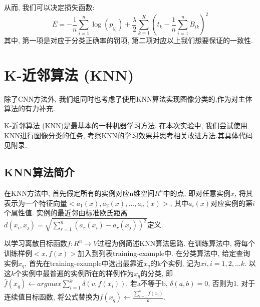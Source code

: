 \documentclass[lang=cn, 11pt,   a4paper]{elegantpaper}
\begin{document}
从而, 我们可以决定损失函数: 
\begin{equation}
E=-\frac{1}{n} \sum_{i=1}^{n} \log \left (p_{y_{i}}\right)+\frac{\lambda}{2} \sum_{k=1}^{K}\left (t_{k}-\frac{1}{n} \sum_{i=1}^{n} B_{i k}\right)^{2}
\end{equation}
其中, 第一项是对应于分类正确率的罚项, 第二项对应以上我们想要保证的一致性.


\section{K-近邻算法 (KNN)}
除了CNN方法外, 我们组同时也考虑了使用KNN算法实现图像分类的,作为对主体算法的有力补充.

K-近邻算法 (KNN)是最基本的一种机器学习方法. 在本次实验中,  我们尝试使用KNN进行图像分类的任务, 考察KNN的学习效果并思考相关改进方法.其具体代码见附录.
\subsection{KNN算法简介}
在KNN方法中,  首先假定所有的实例对应n维空间$R^{n}$中的点,  即对任意实例$x$,  将其表示为一个特征向量$<a_{1} (x), a_{2} (x), ..., a_{n} (x)>$,  其中$a_{i} (x)$对应实例的第$i$个属性值. 实例的最近邻由标准欧氏距离$d (x_{i}, x_{j}) = \sqrt{\sum_{r=1}^{n}{ (a_{r} (x_{i})-a_{r} (x_{j}))^{2}}}$定义. 

以学习离散目标函数$f:  R^{n} \rightarrow V$过程为例简述KNN算法思路. 在训练算法中,  将每个训练样例$<x,  f (x)>$加入到列表training-example中. 在分类算法中,  给定查询实例$x_{q}$,  首先在training-example中选出最靠近$x_{q}$的k个实例,  记为$x{i}, i=1,  2,  ...k$. 以这$k$个实例中最普遍的实例所在的样例作为$x_{q}$的分类,  即$ \hat f (x_{q}) \leftarrow argmax{\sum_{i=1}^{k} \delta (v,  f (x_{i}))}$. 若a不等于b,  $\delta (a,  b)=0$,  否则为1. 对于连续值目标函数,  将公式替换为$\hat f (x_{q}) \leftarrow \frac{\sum_{i=1}^{k}{f (x_{i})}}{k}$. 
\end{document}
